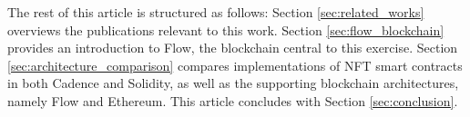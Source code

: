 \documentclass[../NFTComp_IEEE.tex]{subfiles}
\begin{document}
\par
The rest of this article is structured as follows: Section \ref{sec:related_works} overviews the publications relevant to this work. Section \ref{sec:flow_blockchain} provides an introduction to Flow, the blockchain central to this exercise. Section \ref{sec:architecture_comparison} compares implementations of NFT smart contracts in both Cadence and Solidity, as well as the supporting blockchain architectures, namely Flow and Ethereum. This article concludes with Section \ref{sec:conclusion}.
\end{document}
